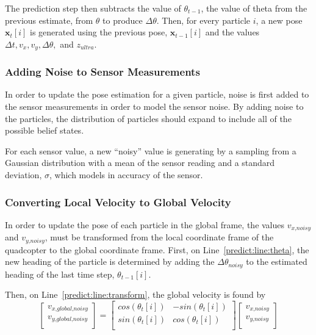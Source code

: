 		The prediction step then subtracts the value of $\theta_{t-1}$, the value of theta from the previous estimate, from $\theta$ to produce $\Delta\theta$. Then, for every particle $i$, a new pose $\textbf{x}_t[i]$ is generated using the previous pose, $\textbf{x}_{t-1}[i]$ and the values $\Delta t, v_x, v_y, \Delta\theta,$ and $z_{ultra}$.

		\subsubsection{Adding Noise to Sensor Measurements}
			In order to update the pose estimation for a given particle, noise is first added to the sensor measurements in order to model the sensor noise. By adding noise to the particles, the distribution of particles should expand to include all of the possible belief states. 

			For each sensor value, a new ``noisy'' value is generating by a sampling from a Gaussian distribution with a mean of the sensor reading and a standard deviation, $\sigma$, which models in accuracy of the sensor. 
		
		\subsubsection{Converting Local Velocity to Global Velocity}
			In order to update the pose of each particle in the global frame, the values $v_{\textit{x,noisy}}$ and $v_{\textit{y,noisy}}$, must be transformed from the local coordinate frame of the quadcopter to the global coordinate frame. First, on Line~\ref{predict:line:theta}, the new heading of the particle is determined by adding the $\Delta\theta_{\textit{noisy}}$ to the estimated heading of the last time step, $\theta_{t-1}[i]$.

			Then, on Line~\ref{predict:line:transform}, the global velocity is found by
			\[
			\begin{bmatrix} 
			  v_{\textit{x,global,noisy}}\\
			  v_{\textit{y,global,noisy}}\\
			\end{bmatrix}
			=
			\begin{bmatrix} 
			  cos(\theta_t[i]) & -sin(\theta_t[i])\\
			  sin(\theta_t[i]) & cos(\theta_t[i])\\
			\end{bmatrix}
			\begin{bmatrix} 
			  v_{\textit{x,noisy}}\\
			  v_{\textit{y,noisy}}\\
			\end{bmatrix}
			\]

